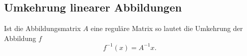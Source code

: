 \subsection{Umkehrung linearer Abbildungen}
\label{sub:umkehrung_linearer_abbildungen}

Ist die Abbildungsmatrix $A$ eine reguläre Matrix so lautet die Umkehrung der Abbildung $f$
\begin{equation}
	f^{-1}(x) = A^{-1}x.
\end{equation}



